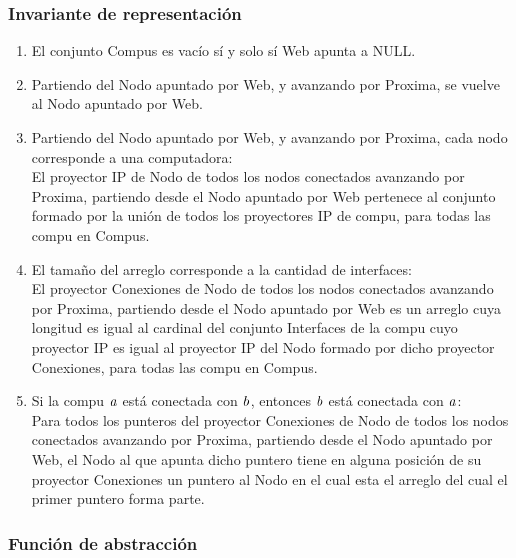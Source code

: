 \subsubsection*{Invariante de representación}

\begin{enumerate}
	\item El conjunto Compus es vacío sí y solo sí Web apunta a NULL.
	\item Partiendo del Nodo apuntado por Web, y avanzando por Proxima, se vuelve al Nodo apuntado por Web.
	\item Partiendo del Nodo apuntado por Web, y avanzando por Proxima, cada nodo corresponde a una computadora: \\El proyector IP de Nodo de todos los nodos conectados avanzando por Proxima, partiendo desde el Nodo apuntado por Web pertenece al conjunto formado por la unión de todos los proyectores IP de compu, para todas las compu en Compus.
	\item El tamaño del arreglo corresponde a la cantidad de interfaces: \\El proyector Conexiones de Nodo de todos los nodos conectados avanzando por Proxima, partiendo desde el Nodo apuntado por Web es un arreglo cuya longitud es igual al cardinal del conjunto Interfaces de la compu cuyo proyector IP es igual al proyector IP del Nodo formado por dicho proyector Conexiones, para todas las compu en Compus.
	\item Si la compu $\text{\textit{a}}$ está conectada con $\text{\textit{b}}$, entonces $\text{\textit{b}}$ está conectada con $\text{\textit{a}}$: \\Para todos los punteros del proyector Conexiones de Nodo de todos los nodos conectados avanzando por Proxima, partiendo desde el Nodo apuntado por Web, el Nodo al que apunta dicho puntero tiene en alguna posición de su proyector Conexiones un puntero al Nodo en el cual esta el arreglo del cual el primer puntero forma parte.
	

		\end{enumerate}

\subsubsection*{Función de abstracción}

